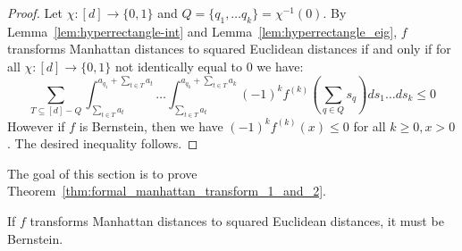 \begin{proof}
  
Let $\chi: [d] \rightarrow \{0,1\}$ and $Q = \{q_1, \ldots q_k \}=\chi^{-1}(0)$.  
By Lemma~\ref{lem:hyperrectangle-int} and Lemma~\ref{lem:hyperrectangle_eig}, $f$ transforms
Manhattan distances to squared Euclidean distances if and only if for all $\chi:
[d] \rightarrow \{0,1\}$ not identically equal to $0$ we have:
\[
  \sum_{T \subseteq [d] - Q}
  \int_{\sum_{t \in T} a_t}^{a_{q_1}+\sum_{t \in T} a_t} \ldots
  \int_{\sum_{t \in T} a_t}^{a_{q_k}+\sum_{t \in T} a_k}
  (-1)^kf^{(k)}\left( \sum_{q \in Q} s_q \right) ds_1 \ldots ds_k \leq
  0
\]
However if $f$ is Bernstein, then we have
  $(-1)^k f^{(k)}(x)\leq 0$ for all $k\geq 0,x>0$. The desired
  inequality follows.
\end{proof}
\fi

The goal of this section is to prove Theorem~\ref{thm:formal_manhattan_transform_1_and_2}.
\begin{theorem} \label{thm:formal_manhattan_transform_1_and_2}
If $f$ transforms
Manhattan distances to squared Euclidean distances, it must be Bernstein. 
\end{theorem}

